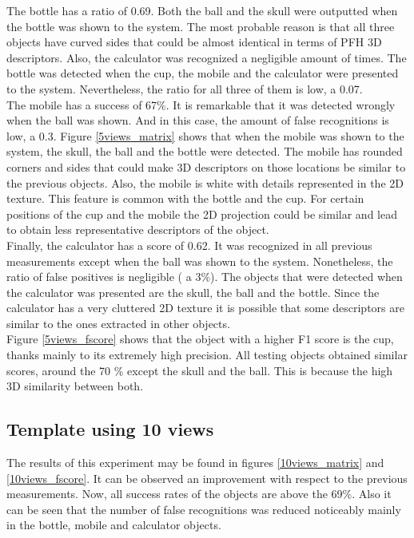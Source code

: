 	The bottle has a ratio of 0.69. 
	Both the ball and the skull were outputted when the bottle was shown to the system. 
	The most probable reason is that all three objects have curved sides that could be almost identical in terms of PFH 3D descriptors. 
	Also, the calculator was recognized a negligible amount of times. 
	The bottle was detected when the cup, the mobile and the calculator were presented to the system. 
	Nevertheless, the ratio for all three of them is low, a 0.07. 
	\\

	The mobile has a success of 67\%. 
	It is remarkable that it was detected wrongly when the ball was shown. 
	And in this case, the amount of false recognitions is low, a 0.3. 
	Figure \ref{5views_matrix} shows that when the mobile was shown to the system, the skull, the ball and the bottle were detected. 
	The mobile has rounded corners and sides that could make 3D descriptors on those locations be similar to the previous objects. 
	Also, the mobile is white with details represented in the 2D texture. 
	This feature is common with the bottle and the cup. 
	For certain positions of the cup and the mobile the 2D projection could be similar and lead to obtain less representative descriptors of the object. 
	\\

	Finally, the calculator has a score of 0.62. 
	It was recognized in all previous measurements except when the ball was shown to the system. 
	Nonetheless, the ratio of false positives is negligible ( a 3\%). 
	The objects that were detected when the calculator was presented are the skull, the ball and the bottle. 
	Since the calculator has a very cluttered 2D texture it is possible that some descriptors are similar to the ones extracted in other objects. 
	\\

	Figure \ref{5views_fscore} shows that the object with a higher F1 score is the cup, thanks mainly to its extremely high precision.  
	All testing objects obtained similar scores, around the 70 \% except the skull and the ball. 
	This is because the high 3D similarity between both. 


	\subsection{Template using 10 views}
	The results of this experiment may be found in figures \ref{10views_matrix} and \ref{10views_fscore}. 
	It can be observed an improvement with respect to the previous measurements. 
	Now, all success rates of the objects are above the 69\%. 
	Also it can be seen that the number of false recognitions was reduced noticeably mainly in the bottle, mobile and calculator objects. 
	\\

